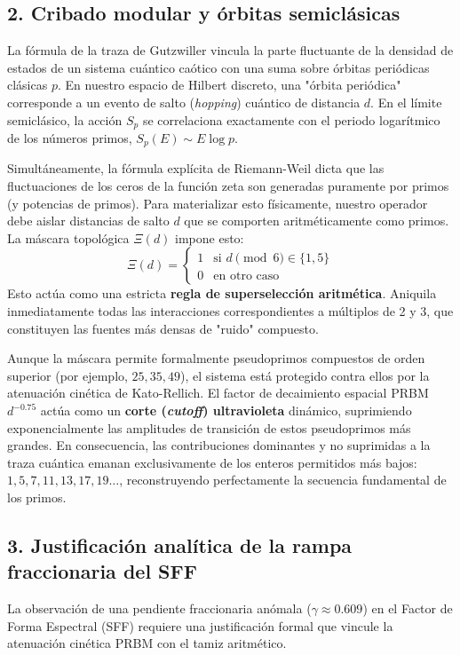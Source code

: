 \documentclass[aps,prl,preprint,superscriptaddress,floatfix]{revtex4-2}
\begin{document}
\subsection{2. Cribado modular y órbitas semiclásicas}
La fórmula de la traza de Gutzwiller vincula la parte fluctuante de la densidad de estados de un sistema cuántico caótico con una suma sobre órbitas periódicas clásicas $p$. En nuestro espacio de Hilbert discreto, una "órbita periódica" corresponde a un evento de salto (\textit{hopping}) cuántico de distancia $d$. En el límite semiclásico, la acción $S_p$ se correlaciona exactamente con el periodo logarítmico de los números primos, $S_p(E) \sim E \log p$.

Simultáneamente, la fórmula explícita de Riemann-Weil dicta que las fluctuaciones de los ceros de la función zeta son generadas puramente por primos (y potencias de primos). Para materializar esto físicamente, nuestro operador debe aislar distancias de salto $d$ que se comporten aritméticamente como primos. La máscara topológica $\Xi(d)$ impone esto:
\begin{equation}
\Xi(d) = \begin{cases} 1 & \text{si } d \pmod 6 \in \{1, 5\} \\ 0 & \text{en otro caso} \end{cases}
\end{equation}
Esto actúa como una estricta \textbf{regla de superselección aritmética}. Aniquila inmediatamente todas las interacciones correspondientes a múltiplos de 2 y 3, que constituyen las fuentes más densas de "ruido" compuesto. 

Aunque la máscara permite formalmente pseudoprimos compuestos de orden superior (por ejemplo, $25, 35, 49$), el sistema está protegido contra ellos por la atenuación cinética de Kato-Rellich. El factor de decaimiento espacial PRBM $d^{-0.75}$ actúa como un \textbf{corte (\textit{cutoff}) ultravioleta} dinámico, suprimiendo exponencialmente las amplitudes de transición de estos pseudoprimos más grandes. En consecuencia, las contribuciones dominantes y no suprimidas a la traza cuántica emanan exclusivamente de los enteros permitidos más bajos: $1, 5, 7, 11, 13, 17, 19 \dots$, reconstruyendo perfectamente la secuencia fundamental de los primos.

\subsection{3. Justificación analítica de la rampa fraccionaria del SFF}
La observación de una pendiente fraccionaria anómala ($\gamma \approx 0.609$) en el Factor de Forma Espectral (SFF) requiere una justificación formal que vincule la atenuación cinética PRBM con el tamiz aritmético. 
\end{document}

